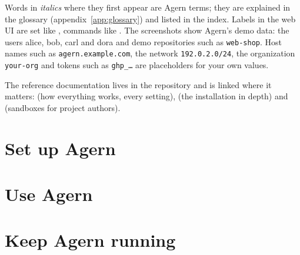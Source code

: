 \documentclass[11pt,a4paper,oneside,openany]{report}
\begin{document}
Words in \emph{italics} where they first appear are Agern terms; they are explained in the
glossary (appendix~\ref{app:glossary}) and listed in the index. Labels in the web UI are set like
, commands like . The screenshots show Agern's demo data: the
users alice, bob, carl and dora and demo repositories such as \texttt{web-shop}. Host names such as
\texttt{agern.example.com}, the network \texttt{192.0.2.0/24}, the organization \texttt{your-org} and
tokens such as \texttt{ghp\_\ldots} are placeholders for your own values.

The reference documentation lives in the repository and is linked where it matters:
 (how everything works, every setting),
 (the installation in depth) and
 (sandboxes for project authors).

\part{Set up Agern}\label{part:setup}






\part{Use Agern}\label{part:use}






\part{Keep Agern running}\label{part:run}



\appendix



\cleardoublepage
{}
{}
\printindex
\end{document}

